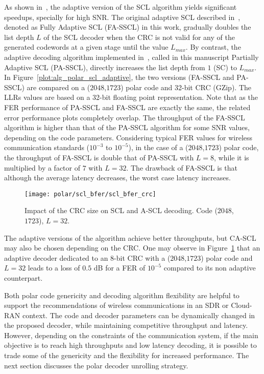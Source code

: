 As shown in~\cite{Sarkis2016}, the adaptive version of the SCL algorithm yields
significant speedups, specially for high SNR. The original adaptive SCL
described in~\cite{Li2012}, denoted as Fully Adaptive SCL (FA-SSCL) in this
work, gradually doubles the list depth $L$ of the SCL decoder when the CRC is
not valid for any of the generated codewords at a given stage until the value
$L_{max}$. By contrast, the adaptive decoding algorithm implemented
in~\cite{Sarkis2016}, called in this manuscript Partially Adaptive SCL
(PA-SSCL), directly increases the list depth from $1$ (SC) to $L_{max}$. In
Figure~\ref{plot:alg_polar_scl_adaptive}, the two versions (FA-SSCL and PA-SSCL)
are compared on a ($2048$,$1723$) polar code and 32-bit CRC (GZip). The LLRs
values are based on a 32-bit floating point representation. Note that as the FER
performance of PA-SSCL and FA-SSCL are exactly the same, the related error
performance plots completely overlap. The throughput of the FA-SSCL algorithm is
higher than that of the PA-SSCL algorithm for some SNR values, depending on the
code parameters. Considering typical FER values for wireless communication
standards ($10^{-3}$ to $10^{-5}$), in the case of a ($2048$,$1723$) polar code,
the throughput of FA-SSCL is double that of PA-SSCL with $L = 8$, while it is
multiplied by a factor of $7$ with $L=32$. The drawback of FA-SSCL is that
although the average latency decreases, the worst case latency increases.

\begin{figure}[htp]
  \centering
  \texttt{[image: polar/scl\_bfer/scl\_bfer\_crc]}
  \caption{Impact of the CRC size on SCL and A-SCL decoding. Code ($2048$,
    $1723$), $L=32$.}
  \label{plot:alg_polar_scl_bfer_crc}
\end{figure}

The adaptive versions of the algorithm achieve better throughputs, but CA-SCL
may also be chosen depending on the CRC. One may observe in
Figure~\ref{plot:alg_polar_scl_bfer_crc} that an adaptive decoder dedicated to
an 8-bit CRC with a ($2048$,$1723$) polar code and $L=32$ leads to a loss of
$0.5$ dB for a FER of $10^{-5}$ compared to its non adaptive counterpart.

Both polar code genericity and decoding algorithm flexibility are helpful to
support the recommendations of wireless communications in an SDR or Cloud-RAN
context. The code and decoder parameters can be dynamically changed in the
proposed decoder, while maintaining competitive throughput and latency.
However, depending on the constraints of the communication system, if the main
objective is to reach high throughputs and low latency decoding, it is possible
to trade some of the genericity and the flexibility for increased performance.
The next section discusses the polar decoder unrolling strategy.

